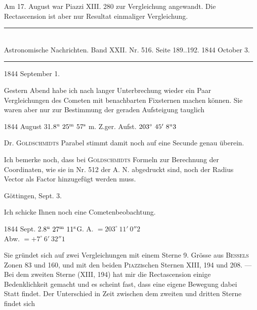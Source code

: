 Am 17. August war Piazzi XIII. 280 zur Vergleichung angewandt. Die Rectascension ist aber nur Resultat einmaliger Vergleichung.

\clearpage
\hypertarget{native-473-lower}{}
\begin{center}
\rule{0.55\linewidth}{0.4pt}\\[2pt]
Astronomische Nachrichten. Band XXII. Nr. 516. Seite 189..192. 1844 October 3.\\[2pt]
\rule{0.55\linewidth}{0.4pt}
\end{center}
\begin{flushright}1844 September 1.\end{flushright}

Gestern Abend habe ich nach langer Unterbrechung wieder ein Paar Vergleichungen des Cometen mit benachbarten Fixsternen machen können. Sie waren aber nur zur Bestimmung der geraden Aufsteigung tauglich

\begin{center}
1844 August 31.\quad $8^{\rm u}\ 25^{\rm m}\ 57^{\rm s}$ m. Z.\quad ger. Aufst. $203^\circ\ 45'\ 8^{\rm u}3$
\end{center}

Dr. \textsc{Goldschmidts} Parabel stimmt damit noch auf eine Secunde genau überein.

Ich bemerke noch, dass bei \textsc{Goldschmidts} Formeln zur Berechnung der Coordinaten, wie sie in Nr. 512 der A. N. abgedruckt sind, noch der Radius Vector als Factor hinzugefügt werden muss.

\begin{flushright}Göttingen, Sept. 3.\end{flushright}

Ich schicke Ihnen noch eine Cometenbeobachtung.

\begin{center}
1844 Sept. 2.\quad $8^{\rm u}\ 27^{\rm m}\ 11^{\rm s}$\quad G. A. $=203^\circ\ 11'\ 0''2$\\[2pt]
Abw. $=+7^\circ\ 6'\ 32''1$
\end{center}

Sie gründet sich auf zwei Vergleichungen mit einem Sterne 9. Grösse aus \textsc{Bessels} Zonen 83 und 160, und mit den beiden \textsc{Piazzi}schen Sternen XIII, 194 und 208. --- Bei dem zweiten Sterne (XIII, 194) hat mir die Rectascension einige Bedenklichkeit gemacht und es scheint fast, dass eine eigene Bewegung dabei Statt findet. Der Unterschied in Zeit zwischen dem zweiten und dritten Sterne findet sich

